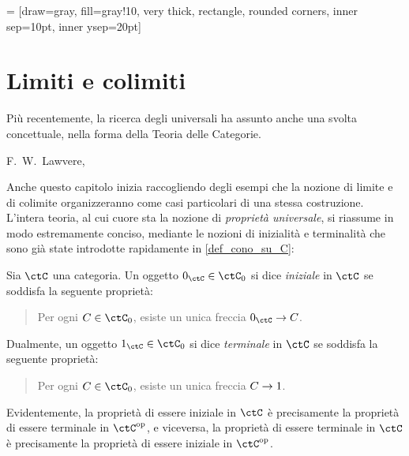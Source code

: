  = [draw=gray, fill=gray!10, very thick,
rectangle, rounded corners, inner sep=10pt, inner ysep=20pt]
\chapter{Limiti e colimiti}\label{chap_limiti_colimiti}
\epigraph{Più recentemente, la ricerca degli universali ha assunto anche una svolta concettuale, nella forma della Teoria delle Categorie.}{F.\ W.\ Lawvere, \cite{lawvere1969adjointness}}



Anche questo capitolo inizia raccogliendo degli esempi che la nozione di limite e di colimite organizzeranno come casi particolari di una stessa costruzione. L'intera teoria, al cui cuore sta la nozione di \emph{proprietà universale}, si riassume in modo estremamente conciso, mediante le nozioni di inizialità e terminalità che sono già state introdotte rapidamente in \ref{def_cono_su_C}:
\begin{definition}
	Sia $\ctC$ una categoria. Un oggetto $\init_\ctC\in\ctC_0$ si dice \emph{iniziale} in $\ctC$ se soddisfa la seguente proprietà:
		      \begin{quote}
			      Per ogni \(C\in\ctC_0\), esiste un unica freccia \(\init_\ctC \to C\).
		      \end{quote}
	Dualmente, un oggetto $\term_\ctC\in\ctC_0$ si dice \emph{terminale} in $\ctC$ se soddisfa la seguente proprietà:
			      \begin{quote}
			      Per ogni \(C\in\ctC_0\), esiste un unica freccia \(C\to1\).
		      \end{quote}
\end{definition}
Evidentemente, la proprietà di essere iniziale in $\ctC$ è precisamente la proprietà di essere terminale in $\ctC^\op$, e viceversa, la proprietà di essere terminale in $\ctC$ è precisamente la proprietà di essere iniziale in $\ctC^\op$.

